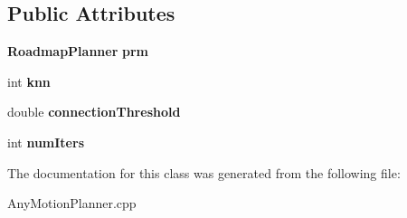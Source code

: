 \subsection*{Public Attributes}
\begin{DoxyCompactItemize}
\item 
{\bf Roadmap\+Planner} {\bfseries prm}\label{classRoadmapPlannerInterface_a2c290a15ea8d309c4f3ce5457e80f20b}

\item 
int {\bfseries knn}\label{classRoadmapPlannerInterface_a2de858ecc62bc3b357a220e5bcb80ea6}

\item 
double {\bfseries connection\+Threshold}\label{classRoadmapPlannerInterface_aeac732d09971dc2a4644549ccf028722}

\item 
int {\bfseries num\+Iters}\label{classRoadmapPlannerInterface_ac9eae34586605e405a71700f24e3de5d}

\end{DoxyCompactItemize}


The documentation for this class was generated from the following file\+:\begin{DoxyCompactItemize}
\item 
Any\+Motion\+Planner.\+cpp\end{DoxyCompactItemize}
